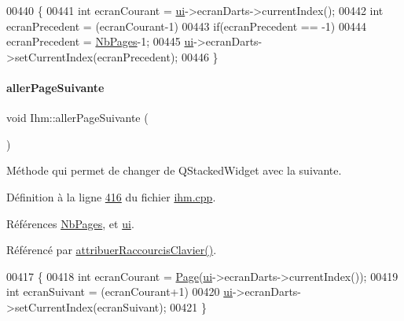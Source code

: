 \begin{DoxyCode}
00440 \{
00441     \textcolor{keywordtype}{int} ecranCourant = \hyperlink{class_ihm_a0ac5f47856566ceeeca1720109bf70ea}{ui}->ecranDarts->currentIndex();
00442     \textcolor{keywordtype}{int} ecranPrecedent = (ecranCourant-1)%
00443     \textcolor{keywordflow}{if}(ecranPrecedent == -1)
00444         ecranPrecedent = \hyperlink{class_ihm_a472c7a7bec7e6e0230842f78ace4833ea9eb2cac6f79bce4cfd72383724004949}{NbPages}-1;
00445     \hyperlink{class_ihm_a0ac5f47856566ceeeca1720109bf70ea}{ui}->ecranDarts->setCurrentIndex(ecranPrecedent);
00446 \}
\end{DoxyCode}
\mbox{\label{class_ihm_a3c53027b16e9ed5f669b9865b2057e6a}} 
\paragraph{\texorpdfstring{aller\+Page\+Suivante}{allerPageSuivante}}
{\footnotesize\ttfamily void Ihm\+::aller\+Page\+Suivante (\begin{DoxyParamCaption}{ }\end{DoxyParamCaption})\hspace{0.3cm}{\ttfamily [slot]}}



Méthode qui permet de changer de Q\+Stacked\+Widget avec la suivante. 



Définition à la ligne \hyperlink{ihm_8cpp_source_l00416}{416} du fichier \hyperlink{ihm_8cpp_source}{ihm.\+cpp}.



Références \hyperlink{ihm_8h_source_l00078}{Nb\+Pages}, et \hyperlink{ihm_8h_source_l00052}{ui}.



Référencé par \hyperlink{ihm_8cpp_source_l00103}{attribuer\+Raccourcis\+Clavier()}.


\begin{DoxyCode}
00417 \{
00418     \textcolor{keywordtype}{int} ecranCourant = \hyperlink{class_ihm_a472c7a7bec7e6e0230842f78ace4833e}{Page}(\hyperlink{class_ihm_a0ac5f47856566ceeeca1720109bf70ea}{ui}->ecranDarts->currentIndex());
00419     \textcolor{keywordtype}{int} ecranSuivant = (ecranCourant+1)%
00420     \hyperlink{class_ihm_a0ac5f47856566ceeeca1720109bf70ea}{ui}->ecranDarts->setCurrentIndex(ecranSuivant);
00421 \}
\end{DoxyCode}
\mbox{\label{class_ihm_a2b7dbb2d087d4ca15cee9707a1796b62}} 
